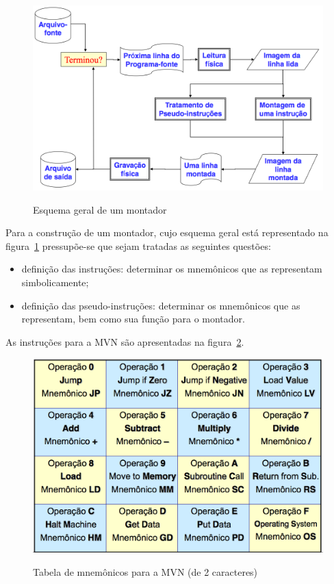 \begin{figure}[ht]
	\centering
	\caption{Esquema geral de um montador}
	\includegraphics[width=\textwidth]{images/esquema-montador.png}
	\label{fig:esquema-montador}
\end{figure}

Para a construção de um montador, cujo esquema geral está representado na figura~\ref{fig:esquema-montador} pressupõe-se que sejam tratadas as seguintes questões:

\begin{itemize}
	\item definição das instruções: determinar os mnemônicos que as representam simbolicamente;
	\item definição das pseudo-instruções: determinar os mnemônicos que as representam, bem como sua função para o montador.
\end{itemize}

As instruções para a MVN são apresentadas na figura~\ref{fig:mnemonicos-mvn}.

\begin{figure}[ht]
	\centering
	\caption{Tabela de mnemônicos para a MVN (de 2 caracteres)}
	\includegraphics[width=\textwidth]{images/mnemonicos-mvn.png}
	\label{fig:mnemonicos-mvn}
\end{figure}


